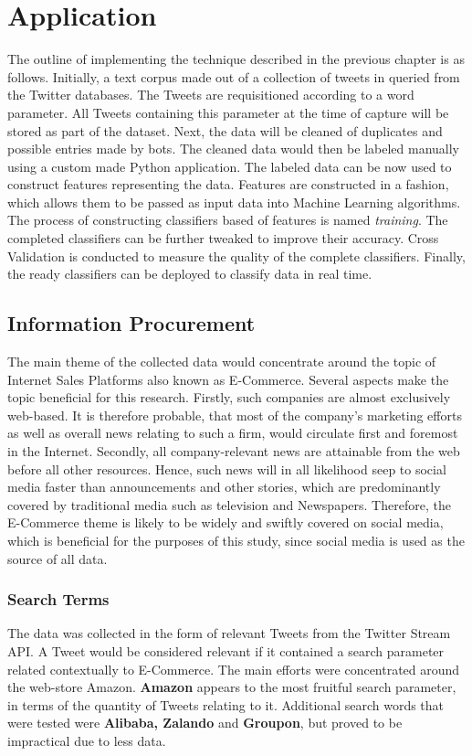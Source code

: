 \section{Application}
\label{Application}
	The outline of implementing the technique described in the previous chapter is as follows. Initially, a text corpus made out of a collection of tweets in queried from the Twitter databases. The Tweets are requisitioned according to a word parameter. All Tweets containing this parameter at the time of capture will be stored as part of the dataset. Next, the data will be cleaned of duplicates and possible entries made by bots. The cleaned data would then be labeled manually using a custom made Python application. The labeled data can be now used to construct features representing the data. Features are constructed in a fashion, which allows them to be passed as input data into Machine Learning algorithms. The process of constructing classifiers based of features is named \textit{training}. The completed classifiers can be further tweaked to improve their accuracy. Cross Validation is conducted to measure the quality of the complete classifiers. Finally, the ready classifiers can be deployed to classify data in real time.

	\subsection{Information Procurement}
	The main theme of the collected data would concentrate around the topic of Internet Sales Platforms also known as E-Commerce. Several aspects make the topic beneficial for this research. Firstly,  such companies are almost exclusively web-based. It is therefore probable, that most of the company's marketing efforts as well as overall news relating to such a firm, would circulate first and foremost in the Internet. Secondly, all company-relevant news are attainable from the web before all other resources. Hence, such news will in all likelihood seep to social media faster than announcements and other stories, which are predominantly covered by traditional media such as television and Newspapers. Therefore, the E-Commerce theme is likely to be widely and swiftly covered on social media, which is beneficial for the purposes of this study, since social media is used as the source of all data.
	
		\subsubsection*{Search Terms}
			The data was collected in the form of relevant Tweets from the Twitter Stream API. A Tweet would be considered relevant if it contained a search parameter related contextually to E-Commerce. The main efforts were concentrated around the web-store Amazon. \textbf{Amazon} appears to the most fruitful search parameter, in terms of the quantity of Tweets relating to it. Additional search words that were tested were {\bfseries Alibaba, Zalando} and {\bfseries Groupon}, but proved to be impractical due to less data. 
			
